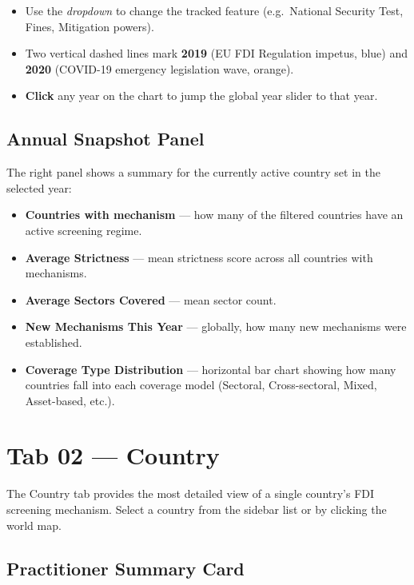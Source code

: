 \documentclass[12pt,a4paper]{article}
\newcommand{\uielem}[1]{\textit{#1}}
\begin{document}
\begin{itemize}
  \item Use the \uielem{dropdown} to change the tracked feature (e.g.\ National Security Test, Fines, Mitigation powers).
  \item Two vertical dashed lines mark \textbf{2019} (EU FDI Regulation impetus, blue) and \textbf{2020} (COVID-19 emergency legislation wave, orange).
  \item \textbf{Click} any year on the chart to jump the global year slider to that year.
\end{itemize}

\subsection{Annual Snapshot Panel}

The right panel shows a summary for the currently active country set in the selected year:

\begin{itemize}
  \item \textbf{Countries with mechanism} — how many of the filtered countries have an active screening regime.
  \item \textbf{Average Strictness} — mean strictness score across all countries with mechanisms.
  \item \textbf{Average Sectors Covered} — mean sector count.
  \item \textbf{New Mechanisms This Year} — globally, how many new mechanisms were established.
  \item \textbf{Coverage Type Distribution} — horizontal bar chart showing how many countries fall into each coverage model (Sectoral, Cross-sectoral, Mixed, Asset-based, etc.).
\end{itemize}

\section{Tab 02 — Country}
\label{sec:country}

The Country tab provides the most detailed view of a single country's FDI screening mechanism. Select a country from the sidebar list or by clicking the world map.

\subsection{Practitioner Summary Card}
\end{document}
